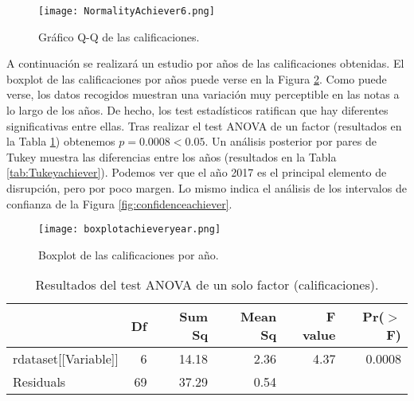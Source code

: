 \begin{figure}[H]
    \centering
    \texttt{[image: NormalityAchiever6.png]}
    \caption{Gráfico Q-Q de las calificaciones.}
    \label{fig:q-qsessionsachiever}
\end{figure}

A continuación se realizará un estudio por años de las calificaciones obtenidas. El boxplot de las calificaciones por años puede verse en la Figura \ref{fig:boxplotachieveryear}. Como puede verse, los datos recogidos muestran una variación muy perceptible en las notas a lo largo de los años. De hecho, los test estadísticos ratifican que hay diferentes significativas entre ellas. Tras realizar el test ANOVA de un factor (resultados en la Tabla \ref{tab:ANOVAachiever}) obtenemos $p = 0.0008 < 0.05$. Un análisis posterior por pares de Tukey muestra las diferencias entre los años (resultados en la Tabla \ref{tab:Tukeyachiever}). Podemos ver que el año 2017 es el principal elemento de disrupción, pero por poco margen. Lo mismo indica el análisis de los intervalos de confianza de la Figura \ref{fig:confidenceachiever}.

\begin{figure}[H]
    \centering
    \texttt{[image: boxplotachieveryear.png]}
    \caption{Boxplot de las calificaciones por año.}
    \label{fig:boxplotachieveryear}
\end{figure}

\begin{table}[H]
\centering
\caption{Resultados del test ANOVA de un solo factor (calificaciones).}
\label{tab:ANOVAachiever}
\centering
\begin{tabular}{lrrrrr}
  \hline
 & Df & Sum Sq & Mean Sq & F value & Pr($>$F) \\ 
  \hline
rdataset[[Variable]] & 6 & 14.18 & 2.36 & 4.37 & 0.0008 \\ 
  Residuals            & 69 & 37.29 & 0.54 &  &  \\ 
   \hline
\end{tabular}
\end{table}

